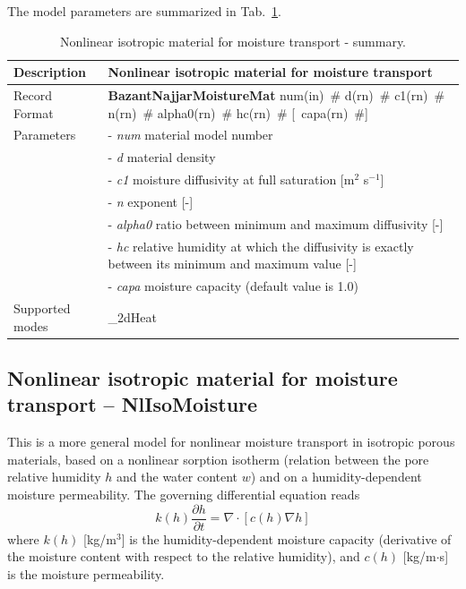 \documentclass[a4paper]{article}
\newcommand{\descitem}[1]{{\noindent \bf #1}}
\newcommand{\elemparam}[2]{{{#1\tiny (#2)}~\#}}
\newcommand{\optelemparam}[2]{[{~\elemparam{#1}{#2}}]}
\newcommand{\param}[1]{{\it #1}}
\begin{document}
The model parameters are summarized in Tab.~\ref{BazantNajjarMoistureMat}.
\begin{table}[!htb]
\begin{tabular}{|l|p{9cm}|}
\hline
Description & Nonlinear isotropic material for moisture transport\\
\hline
Record Format & \descitem{BazantNajjarMoistureMat} \elemparam{num}{in}
\elemparam{d}{rn} \elemparam{c1}{rn} \elemparam{n}{rn}
\elemparam{alpha0}{rn} \elemparam{hc}{rn} \optelemparam{capa}{rn}\\
Parameters &- \param{num} material model number\\
&- \param{d} material density\\
&- \param{c1} moisture diffusivity at full saturation [m$^2$ s$^{-1}$]\\
&- \param{n} exponent [-]\\
&- \param{alpha0} ratio between minimum and maximum diffusivity [-]\\
&- \param{hc} relative humidity at which the diffusivity is exactly
between its minimum and maximum value [-] \\
&- \param{capa} moisture capacity (default value is 1.0)\\

Supported modes& \_2dHeat\\
\hline
\end{tabular}
\caption{Nonlinear isotropic material for moisture transport - summary.}
\label{BazantNajjarMoistureMat}
\end{table}



\subsection{Nonlinear isotropic material for moisture transport -- NlIsoMoisture}
\label{sec:NlIsoMoistureMat}
This is a more general model for nonlinear moisture transport in isotropic 
porous
materials, based on a nonlinear sorption isotherm (relation between 
the pore relative humidity $h$ and the water content $w$) 
and on a humidity-dependent
moisture permeability.
The governing differential equation reads
\begin{equation}\label{nlisomoisture:governing}
k(h) \frac{\partial h}{\partial t} = \nabla \cdot \left[ c(h) \nabla h \right]
\end{equation} 
where 
$k(h)$ [kg/m$^3$] is the humidity-dependent moisture capacity (derivative of
the moisture content with respect to the relative humidity), and $c(h)$
[kg/m$\cdot$s] is the moisture permeability. 
\end{document}
